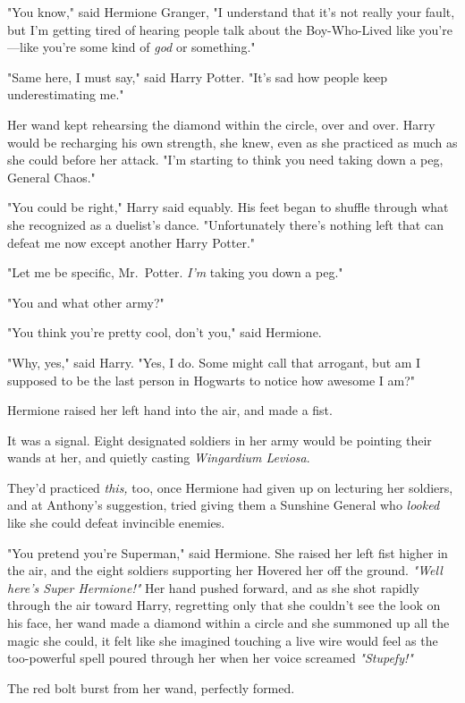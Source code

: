 "You know," said Hermione Granger, "I understand that it's not really your
fault, but I'm getting tired of hearing people talk about the Boy-Who-Lived
like you're---like you're some kind of \emph{god} or something."

"Same here, I must say," said Harry Potter. "It's sad how people keep
underestimating me."

Her wand kept rehearsing the diamond within the circle, over and over. Harry
would be recharging his own strength, she knew, even as she practiced as much
as she could before her attack. "I'm starting to think you need taking down a
peg, General Chaos."

"You could be right," Harry said equably. His feet began to shuffle through
what she recognized as a duelist's dance. "Unfortunately there's nothing left
that can defeat me now except another Harry Potter."

"Let me be specific, Mr.~Potter. \emph{I'm} taking you down a peg."

"You and what other army?"

"You think you're pretty cool, don't you," said Hermione.

"Why, yes," said Harry. "Yes, I do. Some might call that arrogant, but am I
supposed to be the last person in Hogwarts to notice how awesome I am?"

Hermione raised her left hand into the air, and made a fist.

It was a signal. Eight designated soldiers in her army would be pointing their
wands at her, and quietly casting \emph{Wingardium Leviosa}.

They'd practiced \emph{this,} too, once Hermione had given up on lecturing her
soldiers, and at Anthony's suggestion, tried giving them a Sunshine General who
\emph{looked} like she could defeat invincible enemies.

"You pretend you're Superman," said Hermione. She raised her left fist higher
in the air, and the eight soldiers supporting her Hovered her off the ground.
\emph{"Well here's Super Hermione!"} Her hand pushed forward, and as she shot
rapidly through the air toward Harry, regretting only that she couldn't see the
look on his face, her wand made a diamond within a circle and she summoned up
all the magic she could, it felt like she imagined touching a live wire would
feel as the too-powerful spell poured through her when her voice screamed
\emph{"Stupefy!"}

The red bolt burst from her wand, perfectly formed.

